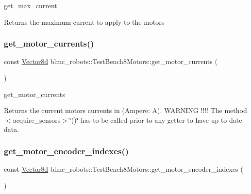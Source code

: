 get\+\_\+max\+\_\+current 

\begin{DoxyReturn}{Returns}
the maximum current to apply to the motors 
\end{DoxyReturn}
\mbox{\label{classblmc__robots_1_1TestBench8Motors_a9bac22cb6522afd6412e8fbb56f11fbf}} 
\subsubsection{\texorpdfstring{get\+\_\+motor\+\_\+currents()}{get\_motor\_currents()}}
{\footnotesize\ttfamily const \hyperlink{common__header_8hpp_a98975ffbe0bca1296078e0350dfedd60}{Vector8d} blmc\+\_\+robots\+::\+Test\+Bench8\+Motors\+::get\+\_\+motor\+\_\+currents (\begin{DoxyParamCaption}{ }\end{DoxyParamCaption})\hspace{0.3cm}{\ttfamily [inline]}}



get\+\_\+motor\+\_\+currents 

\begin{DoxyReturn}{Returns}
the current motors currents in (Ampere\+: A). W\+A\+R\+N\+I\+NG !!!! The method $<$acquire\+\_\+sensors$>$\char`\"{}()\char`\"{} has to be called prior to any getter to have up to date data. 
\end{DoxyReturn}
\mbox{\label{classblmc__robots_1_1TestBench8Motors_ab1d81b573c721e5c8ad400ed4fb4d6ef}} 
\subsubsection{\texorpdfstring{get\+\_\+motor\+\_\+encoder\+\_\+indexes()}{get\_motor\_encoder\_indexes()}}
{\footnotesize\ttfamily const \hyperlink{common__header_8hpp_a98975ffbe0bca1296078e0350dfedd60}{Vector8d} blmc\+\_\+robots\+::\+Test\+Bench8\+Motors\+::get\+\_\+motor\+\_\+encoder\+\_\+indexes (\begin{DoxyParamCaption}{ }\end{DoxyParamCaption})\hspace{0.3cm}{\ttfamily [inline]}}



